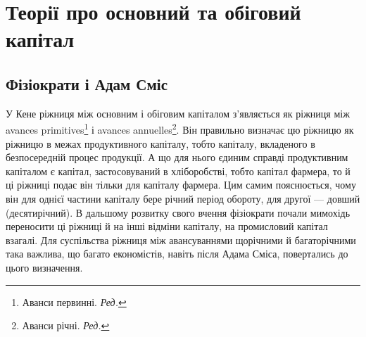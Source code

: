 \section{Теорії про основний та обіговий капітал}

\subsection{Фізіократи і Адам Сміс}

У Кене ріжниця між основним і обіговим капіталом з’являється як
ріжниця між avances primitives\footnote*{
Аванси первинні. \emph{Ред.}
} і avances annuelles\footnote*{
Аванси річні. \emph{Ред.}
}. Він правильно визначає
цю ріжницю як ріжницю в межах продуктивного капіталу, тобто
капіталу, вкладеного в безпосередній процес продукції. А що для нього
єдиним справді продуктивним капіталом є капітал, застосовуваний в хліборобстві,
тобто капітал фармера, то й ці ріжниці подає він тільки для
капіталу фармера. Цим самим пояснюється, чому він для однієї частини
капіталу бере річний період обороту, для другої — довший (десятирічний).
В дальшому розвитку свого вчення фізіократи почали мимохідь переносити
ці ріжниці й на інші відміни капіталу, на промисловий капітал взагалі.
Для суспільства ріжниця між авансуваннями щорічними й багаторічними
така важлива, що багато економістів, навіть після Адама Сміса,
повертались до цього визначення.

